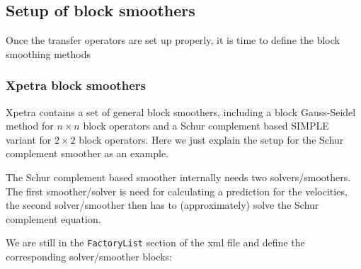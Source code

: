 \documentclass[10pt,fleqn]{book}
\begin{document}
\subsection{Setup of block smoothers}

Once the transfer operators are set up properly, it is time to define the block smoothing methods

\subsubsection{Xpetra block smoothers}

Xpetra contains a set of general block smoothers, including a block Gauss-Seidel method for $n\times n$ block operators and a Schur complement based SIMPLE variant for $2\times 2$ block operators. Here we just explain the setup for the Schur complement smoother as an example.

The Schur complement based smoother internally needs two solvers/smoothers. The first smoother/solver is need for calculating a prediction for the velocities, the second solver/smoother then has to (approximately) solve the Schur complement equation. 

We are still in the \texttt{FactoryList} section of the xml file and define the corresponding solver/smoother blocks:
\end{document}
